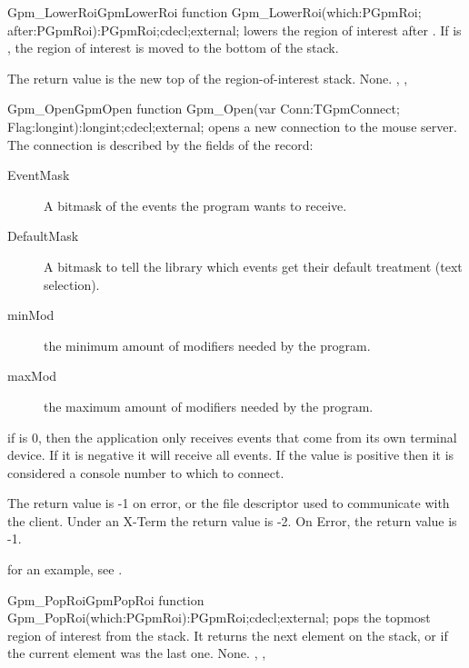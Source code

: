 \begin{functionl}{Gpm\_LowerRoi}{GpmLowerRoi}
\Declaration
function Gpm\_LowerRoi(which:PGpmRoi; after:PGpmRoi):PGpmRoi;cdecl;external;
\Description
{} lowers the region of interest  after
. If  is , the region of interest is moved to
the bottom of the stack.

The return value is the new top of the region-of-interest stack.
\Errors
None.
\SeeAlso
{},
,
\end{functionl}

\begin{functionl}{Gpm\_Open}{GpmOpen}
\Declaration
function Gpm\_Open(var Conn:TGpmConnect; Flag:longint):longint;cdecl;external;
\Description
{} opens a new connection to the mouse server. The connection
is described by the fields of the  record:
\begin{description}
\item[EventMask] A bitmask of the events the program wants to receive.
\item[DefaultMask] A bitmask to tell the library which events get their
default treatment (text selection).
\item[minMod] the minimum amount of modifiers needed by the program.
\item[maxMod] the maximum amount of modifiers needed by the program.
\end{description}
if  is 0, then the application only receives events that come from
its own terminal device. If it is negative it will receive all events. If
the value is positive then it is considered a console number to which to
connect.

The return value is -1 on error, or the file descriptor used to communicate
with the client. Under an X-Term the return value is -2.
\Errors
On Error, the return value is -1.
\SeeAlso
{}
\end{functionl}

for an example, see .

\begin{functionl}{Gpm\_PopRoi}{GpmPopRoi}
\Declaration
function Gpm\_PopRoi(which:PGpmRoi):PGpmRoi;cdecl;external;
\Description
{} pops the topmost region of interest from the stack.
It returns the next element on the stack, or  if the current 
element was the last one.
\Errors
None.
\SeeAlso
{},
, 
\end{functionl}

